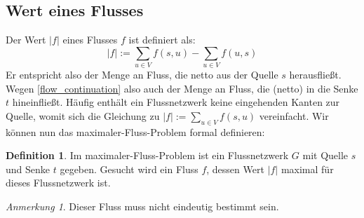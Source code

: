 \documentclass[12pt,a4paper,titlepage,onecolumn,ngerman]{scrartcl}
\theoremstyle{definition}
\newtheorem*{definition}{Definition}
\theoremstyle{remark}
\newtheorem*{remark}{Anmerkung}
\begin{document}
\subsection{Wert eines Flusses}
Der Wert $\lvert f \rvert$ eines Flusses $f$ ist definiert als:
\begin{equation}\label{flow_value}
\lvert f \rvert := \sum_{u\in V} f(s,u) - \sum_{u\in V} f(u,s)
\end{equation}
Er entspricht also der Menge an Fluss, die \glqq netto\grqq{} aus der Quelle $s$ herausfließt.
Wegen \eqref{flow_continuation} also auch der Menge an Fluss, die (\glqq netto\grqq{}) in die Senke $t$ hineinfließt.
Häufig enthält ein Flussnetzwerk keine eingehenden Kanten zur Quelle, womit sich die Gleichung zu $\lvert f \rvert := \sum_{u\in V} f(s,u)$ vereinfacht.
Wir können nun das maximaler-Fluss-Problem formal definieren:

\begin{definition}
Im maximaler-Fluss-Problem ist ein Flussnetzwerk $G$ mit Quelle $s$ und Senke $t$ gegeben.
Gesucht wird ein Fluss $f$, dessen Wert $\lvert f\rvert$ maximal für dieses Flussnetzwerk ist.
\end{definition}
\begin{remark}    
Dieser Fluss muss nicht eindeutig bestimmt sein. %
\end{remark}
\end{document}
